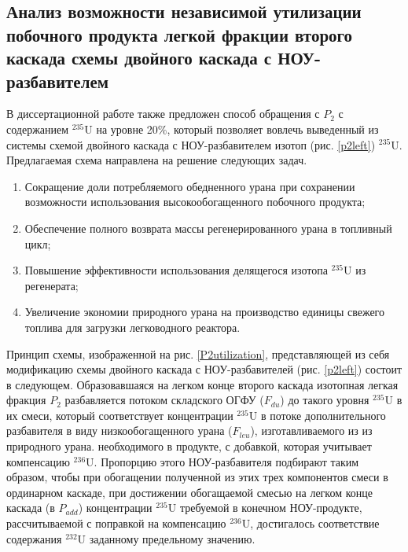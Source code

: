 

\subsection{Анализ возможности независимой утилизации побочного продукта легкой фракции второго каскада схемы двойного каскада с НОУ-разбавителем}

В диссертационной работе также предложен способ обращения с $P_2$ с содержанием $^{235}$U на уровне 20\%, который позволяет вовлечь выведенный из системы схемой двойного каскада с НОУ-разбавителем изотоп (рис. \ref{p2left}) $^{235}$U. Предлагаемая схема направлена на решение следующих задач.

\begin{enumerate}
  \item Сокращение доли потребляемого обедненного урана при сохранении возможности использования высокообогащенного побочного продукта;
  \item Обеспечение полного возврата массы регенерированного урана в топливный цикл;
  \item Повышение эффективности использования делящегося изотопа $^{235}$U из регенерата;
  \item Увеличение экономии природного урана на производство единицы свежего топлива для загрузки легководного реактора.
\end{enumerate}

Принцип схемы, изображенной на рис. \ref{P2utilization}, представляющей из себя модификацию схемы двойного каскада с НОУ-разбавителей (рис. \ref{p2left}) состоит в следующем.
Образовавшаяся на легком конце второго каскада изотопная легкая фракция $P_2$  разбавляется потоком складского ОГФУ ($F_{du}$) до такого уровня $^{235}$U в их смеси, который соответствует концентрации $^{235}$U в потоке дополнительного разбавителя в виду низкообогащенного урана ($F_{leu}$), изготавливаемого из из природного урана. необходимого в продукте, с добавкой, которая учитывает компенсацию $^{236}$U. Пропорцию этого НОУ-разбавителя подбирают таким образом, чтобы при обогащении полученной из этих трех компонентов смеси в ординарном каскаде, при достижении обогащаемой смесью на легком конце каскада (в  $P_{add}$) концентрации $^{235}$U требуемой в конечном НОУ-продукте, рассчитываемой с поправкой на компенсацию $^{236}$U, достигалось соответствие содержания $^{232}$U заданному предельному значению.

